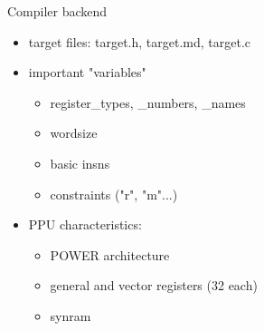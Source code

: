 \documentclass[10pt]{beamer}
\begin{document}
\begin{frame}[fragile]{Compiler backend}
	\begin{itemize}
		\item target files: target.h, target.md, target.c
		\item important "variables"
			\begin{itemize}
				\item register\_types, \_numbers, \_names
				\item wordsize
				\item basic insns
				\item constraints ("r", "m"...)
			\end{itemize}
		\item PPU characteristics:
			\begin{itemize}
				\item POWER architecture
				\item general and vector registers (32 each)
				\item synram
			\end{itemize}
 	\end{itemize}
\end{frame}
\end{document}
